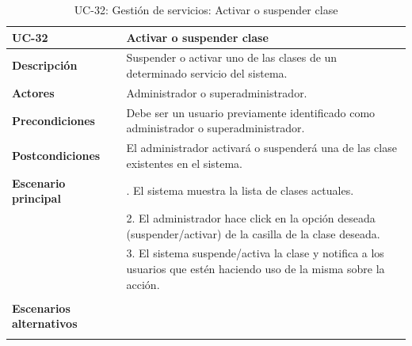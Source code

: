 \begin{table}[H]
  \begin{center}
    \begin{tabularx}{16.4cm}{|l|X|}
      \hline
      \textbf{UC-32} & \textbf{Activar o suspender clase}\\
      \hline
      \textbf{Descripción} & Suspender o activar uno de las clases de un determinado servicio del sistema.\\
      \hline
      \textbf{Actores} & Administrador o superadministrador.\\
      \hline
      \textbf{Precondiciones} & Debe ser un usuario previamente identificado como administrador o superadministrador.\\
      \hline
      \textbf{Postcondiciones} & El administrador activará o suspenderá una de las clase existentes en el sistema.\\
      \hline
      \textbf{Escenario principal} & \smallskip 1. El sistema muestra la lista de clases actuales.\\
      & 2. El administrador hace click en la opción deseada (suspender/activar) de la casilla de la clase deseada.\\
      & 3. El sistema suspende/activa la clase y notifica a los usuarios que estén haciendo uso de la misma sobre la acción.\\
      & \\
      \hline
      \textbf{Escenarios alternativos} & \smallskip \\
      & \\
      \hline
    \end{tabularx}
    \caption{UC-32: Gestión de servicios: Activar o suspender clase}
    \label{tab:CU-activar-suspender-clase}
  \end{center}
\end{table}


